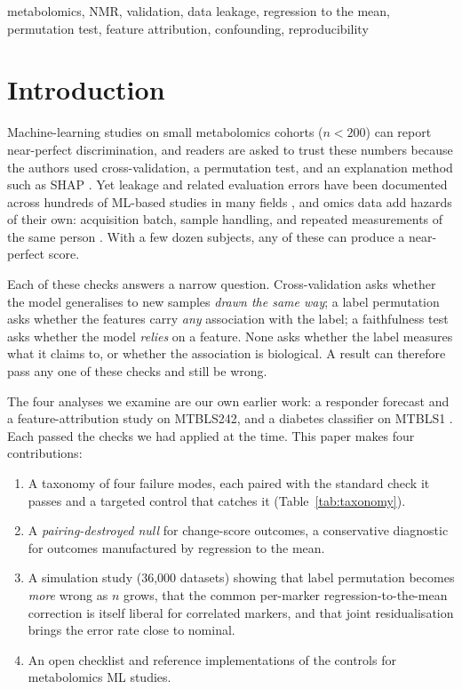 \documentclass[conference]{IEEEtran}
\begin{document}
\begin{IEEEkeywords}
metabolomics, NMR, validation, data leakage, regression to the mean,
permutation test, feature attribution, confounding, reproducibility
\end{IEEEkeywords}

\section{Introduction}
\label{sec:intro}

Machine-learning studies on small metabolomics cohorts ($n<200$) can report
near-perfect discrimination, and readers are asked to trust these numbers
because the authors used cross-validation, a permutation test, and an
explanation method such as SHAP \cite{lundberg2017}. Yet leakage and related
evaluation errors have been documented across hundreds of ML-based studies in
many fields \cite{kapoor2023}, and omics data add hazards of their own:
acquisition batch, sample handling, and repeated measurements of the same
person \cite{leek2010}. With a few dozen subjects, any of these can produce a
near-perfect score.

Each of these checks answers a narrow question. Cross-validation asks whether
the model generalises to new samples \emph{drawn the same way}; a label
permutation asks whether the features carry \emph{any} association with the
label; a faithfulness test asks whether the model \emph{relies} on a feature.
None asks whether the label measures what it claims to, or whether the
association is biological. A result can therefore pass any one of these checks
and still be wrong.

The four analyses we examine are our own earlier work: a responder forecast
and a feature-attribution study on MTBLS242, and a diabetes classifier on
MTBLS1 \cite{bridge2026, roar2026, honest2026}. Each passed the checks we
had applied at the time. This paper makes four contributions:
\begin{enumerate}
  \item A taxonomy of four failure modes, each paired with the standard check
        it passes and a targeted control that catches it
        (Table~\ref{tab:taxonomy}).
  \item A \emph{pairing-destroyed null} for change-score outcomes, a
        conservative diagnostic for outcomes manufactured by regression to
        the mean.
  \item A simulation study (36{,}000 datasets) showing that label permutation
        becomes \emph{more} wrong as $n$ grows, that the common per-marker
        regression-to-the-mean correction is itself liberal for correlated
        markers, and that joint residualisation brings the error rate close
        to nominal.
  \item An open checklist and reference implementations of the controls for
        metabolomics ML studies.
\end{enumerate}
\end{document}
